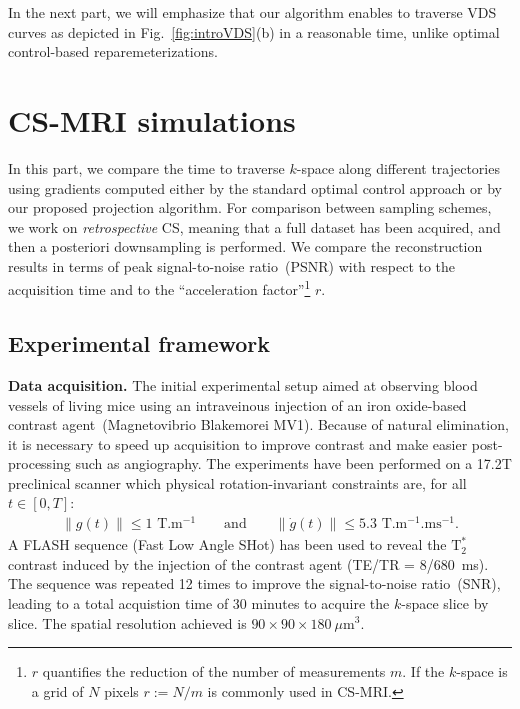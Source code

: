 \documentclass{article}
\begin{document}
In the next part, we will emphasize that our algorithm enables to traverse VDS curves as depicted in Fig.~\ref{fig:introVDS}(b) in a reasonable time, unlike optimal control-based reparemeterizations. 

\section{CS-MRI simulations}
\label{sec:simul}

In this part, we compare the time to traverse $k$-space along different trajectories using gradients computed either by the standard optimal control approach or by our proposed projection algorithm. For comparison between sampling schemes, we work on \emph{retrospective} CS, meaning that a full dataset has been acquired, and then a posteriori downsampling is performed. \noindent We compare the reconstruction results in terms of peak signal-to-noise ratio~(PSNR) with respect to the acquisition time and to the ``acceleration factor''\footnote{$r$ quantifies the reduction of the number of measurements $m$. If the $k$-space is a grid of $N$ pixels $r:=N/m$ is commonly used in CS-MRI.} $r$.

\subsection{Experimental framework}

\noindent\textbf{Data acquisition.}
The initial experimental setup aimed at observing blood vessels of living mice using an intraveinous injection of an iron oxide-based contrast agent~(Magnetovibrio Blakemorei MV1). Because of natural elimination, it is necessary to speed up acquisition to improve contrast and make easier post-processing such as angiography.
The experiments have been performed on a 17.2T preclinical scanner which physical rotation-invariant constraints are, for all $t \in [0,T]$: 
\begin{align*}
\|g(t)\| \leqslant 1 \mbox{ T.m$^{-1}$} \qquad \mbox{and} \qquad \|\dot g(t)\| \leqslant 5.3 \mbox{ T.m$^{-1}$.ms$^{-1}$} .
\end{align*}
A FLASH sequence (Fast Low Angle SHot) has been used to reveal the $\text{T}^*_2$ contrast induced by the injection of the contrast agent (TE/TR = 8/680~ms). The sequence was repeated 12 times to improve the signal-to-noise ratio~(SNR), leading to a total acquistion time of 30 minutes to acquire the $k$-space slice by slice. The spatial resolution achieved is $90\!\times\! 90\! \times \! 180 \ \mu\text{m}^3$.
\end{document}
